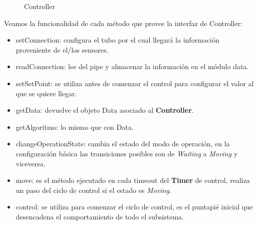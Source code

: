 \begin{figure}[h]
\caption{Controller}
\begin{center}
\end{center}
\end{figure}

Veamos la funcionalidad de cada método que provee la interfaz de Controller:
\begin{itemize}
    \item setConnection: configura el tubo por el cual llegará la información proveniente de el/los sensores.
    \item readConnection: lee del pipe y almacenar la información en el módulo data.
    \item setSetPoint: se utiliza antes de comenzar el control para configurar el valor al que se quiere llegar.
    \item getData: devuelve el objeto Data asociado al \textbf{Controller}.
    \item getAlgoritmo: lo mismo que con Data.
    \item changeOperationState: cambia el estado del modo de operación, en la configuración básica las transiciones posibles son de \textit{Waiting} a \textit{Moving} y viceversa.
    \item move: es el método ejecutado en cada timeout del \textbf{Timer} de control, realiza un paso del ciclo de control si el estado es \textit{Moving}.
    \item control: se utiliza para comenzar el ciclo de control, es el puntapié inicial que desencadena el comportamiento de todo el subsistema.
\end{itemize}


